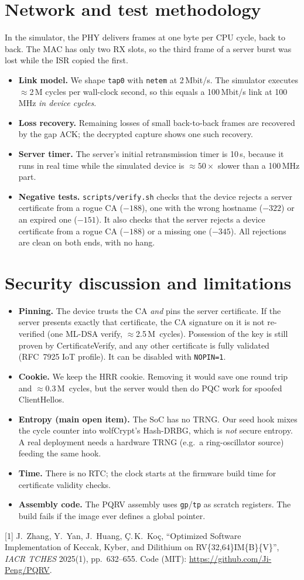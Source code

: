 \documentclass[10pt,a4paper]{article}
\newcommand{\M}{\,M}
\begin{document}
\section{Network and test methodology}
In the simulator, the PHY delivers frames at one byte per CPU cycle, back to back. The MAC has only two RX slots,
so the third frame of a server burst was lost while the ISR copied the first.
\begin{itemize}
  \item \textbf{Link model.} We shape \texttt{tap0} with \texttt{netem} at 2\,Mbit/s. The simulator executes
    ${\approx}$2\,M cycles per wall-clock second, so this equals a 100\,Mbit/s link at 100\,MHz \emph{in device cycles}.
  \item \textbf{Loss recovery.} Remaining losses of small back-to-back frames are recovered by the gap ACK; the
    decrypted capture shows one such recovery.
  \item \textbf{Server timer.} The server's initial retransmission timer is 10\,s, because it runs in real time
    while the simulated device is ${\approx}50\times$ slower than a 100\,MHz part.
  \item \textbf{Negative tests.} \texttt{scripts/verify.sh} checks that the device rejects a server certificate from
    a rogue CA ($-188$), one with the wrong hostname ($-322$) or an expired one ($-151$). It also checks that the server
    rejects a device certificate from a rogue CA ($-188$) or a missing one ($-345$). All rejections are clean on both
    ends, with no hang.
\end{itemize}

\section{Security discussion and limitations}
\begin{itemize}
  \item \textbf{Pinning.} The device trusts the CA \emph{and} pins the server certificate. If the server presents
    exactly that certificate, the CA signature on it is not re-verified (one ML-DSA verify, ${\approx}$2.5\M\ cycles).
    Possession of the key is still proven by CertificateVerify, and any other certificate is fully validated
    (RFC~7925 IoT profile). It can be disabled with \texttt{NOPIN=1}.
  \item \textbf{Cookie.} We keep the HRR cookie. Removing it would save one round trip and ${\approx}$0.3\M\ cycles,
    but the server would then do PQC work for spoofed ClientHellos.
  \item \textbf{Entropy (main open item).} The SoC has no TRNG. Our seed hook mixes the cycle counter into
    wolfCrypt's Hash-DRBG, which is \emph{not} secure entropy. A real deployment needs a hardware TRNG (e.g.\ a
    ring-oscillator source) feeding the same hook.
  \item \textbf{Time.} There is no RTC; the clock starts at the firmware build time for certificate validity checks.
  \item \textbf{Assembly code.} The PQRV assembly uses \texttt{gp}/\texttt{tp} as scratch registers. The build fails
    if the image ever defines a global pointer.
\end{itemize}

\vspace{2pt}
{\small [1] J.~Zhang, Y.~Yan, J.~Huang, Ç.\,K.~Koç, ``Optimized Software Implementation of Keccak, Kyber, and
Dilithium on RV\{32,64\}IM\{B\}\{V\}'', \emph{IACR TCHES} 2025(1), pp.~632--655. Code (MIT):
\url{https://github.com/Ji-Peng/PQRV}.}
\end{document}
